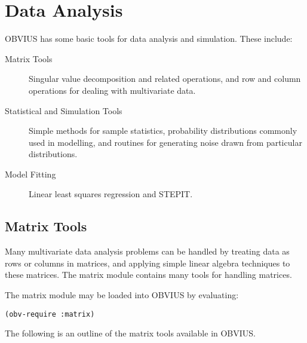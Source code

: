 \section{Data Analysis}
\label{sec:data-analysis}

OBVIUS has some basic tools for data analysis and simulation. 
These include:

\begin{description}
\item[Matrix Tools] Singular value decomposition and related
operations, and row and column operations 
for dealing with multivariate data.

\item[Statistical and Simulation Tools] 
Simple methods for sample statistics, 
probability distributions commonly used in modelling,
and routines for generating noise drawn from particular distributions.

\item[Model Fitting] Linear least squares regression and STEPIT.

\end{description}



\subsection{Matrix Tools}

Many multivariate data analysis problems can be handled by
treating data as rows or columns in matrices, 
and applying simple linear algebra techniques to these matrices.
The matrix module contains many tools for handling matrices.

The matrix module may be loaded into OBVIUS by evaluating:
\begin{verbatim}
(obv-require :matrix)
\end{verbatim}

The following is an outline of the matrix tools available in OBVIUS.

